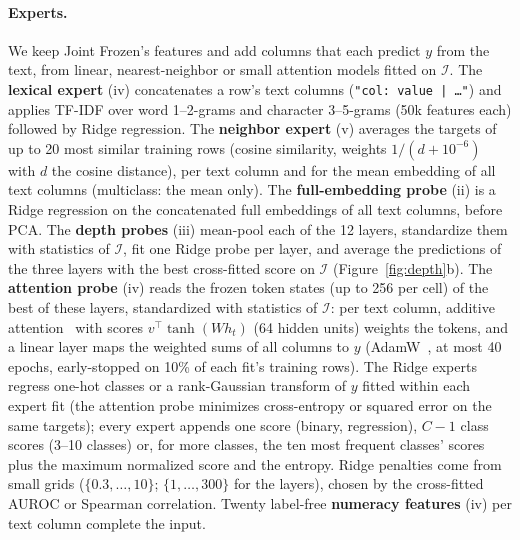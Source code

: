 \documentclass{article}
\begin{document}
\paragraph{Experts.}
We keep Joint Frozen's features and add columns that each predict $y$ from the text, from linear, nearest-neighbor
or small attention models fitted on $\mathcal{I}$. The \textbf{lexical expert} (iv) concatenates a row's text columns
(\texttt{"col: value | \dots"}) and applies TF-IDF over word 1--2-grams and character 3--5-grams (50k
features each) followed by Ridge regression. The \textbf{neighbor expert} (v) averages the targets of up to 20 most similar training
rows (cosine similarity, weights $1/(d+10^{-6})$ with $d$ the cosine distance), per text column and for the mean embedding
of all text columns (multiclass: the mean only). The \textbf{full-embedding probe} (ii) is a Ridge regression on the
concatenated full embeddings of all text columns, before PCA. The \textbf{depth probes} (iii) mean-pool each of the 12
layers, standardize them with statistics of $\mathcal{I}$, fit one Ridge probe per layer, and average the predictions
of the three layers with the best cross-fitted score on $\mathcal{I}$ (Figure~\ref{fig:depth}b). The \textbf{attention probe} (iv) reads the
frozen token states (up to 256 per cell) of the best of these layers, standardized with statistics of $\mathcal{I}$:
per text column, additive attention~\citep{lin2017structured} with scores $v^\top\tanh(W h_t)$ (64 hidden units)
weights the tokens, and a linear layer maps the weighted sums of all columns to $y$ (AdamW~\citep{loshchilov2019adamw}, at most 40 epochs,
early-stopped on 10\% of each fit's training rows). The Ridge
experts regress one-hot classes or a rank-Gaussian transform of $y$ fitted within each expert fit (the attention probe
minimizes cross-entropy or squared error on the same targets); every expert appends one score (binary, regression), $C{-}1$ class scores (3--10 classes) or, for more
classes, the ten most frequent classes' scores plus the maximum normalized score and the entropy. Ridge penalties come from small grids ($\{0.3, \dots, 10\}$; $\{1, \dots, 300\}$ for the layers), chosen by
the cross-fitted AUROC or Spearman correlation. Twenty
label-free \textbf{numeracy features} (iv) per text column complete the input.
\end{document}
